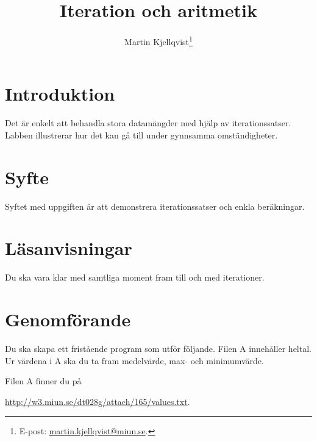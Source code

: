 \documentclass[a4paper]{miunasgn}
\title{Iteration och aritmetik}
\author{Martin Kjellqvist\footnote{%
	E-post: \href{mailto:martin.kjellqvist@miun.se}{martin.kjellqvist@miun.se}.
}}
\begin{document}
\maketitle
\thispagestyle{foot}

\section{Introduktion}
\label{sec:Introduktion}
\noindent
Det är enkelt att behandla stora datamängder med hjälp av iterationssatser.  
Labben illustrerar hur det kan gå till under gynnsamma omständigheter.

\section{Syfte}
\label{sec:Syfte}
\noindent
Syftet med uppgiften är att demonstrera iterationssatser och enkla beräkningar.  
\section{Läsanvisningar}
\label{sec:Lasanvisningar}
\noindent
%
Du ska vara klar med samtliga moment fram till och med iterationer. 

\section{Genomförande}
\label{sec:Genomforande}
\noindent
Du ska skapa ett fristående program som utför följande.
Filen A innehåller heltal.
Ur värdena i A ska du ta fram medelvärde, max- och minimumvärde.

Filen A finner du på
\begin{center}
	\url{http://w3.miun.se/dt028g/attach/165/values.txt}.
\end{center}
	

\end{document}
